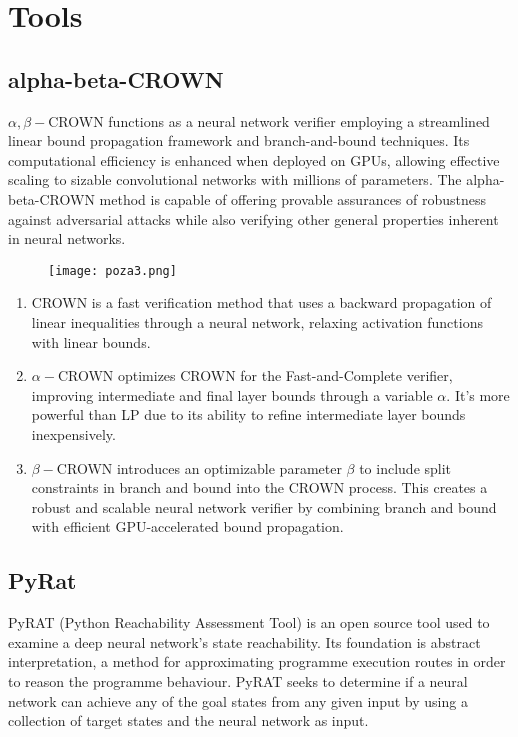 \documentclass[runningheads]{llncs}
\begin{document}
\section{Tools}

\subsection{alpha-beta-CROWN}
\vspace{5mm}
$\alpha,\beta -$CROWN functions as a neural network verifier employing a streamlined linear bound propagation framework and branch-and-bound techniques. Its computational efficiency is enhanced when deployed on GPUs, allowing effective scaling to sizable convolutional networks with millions of parameters. The alpha-beta-CROWN method is capable of offering provable assurances of robustness against adversarial attacks while also verifying other general properties inherent in neural networks.
\begin{center}
\begin{figure}[h]
\texttt{[image: poza3.png]}
\end{figure}
\end{center}

\begin{enumerate}
    \item CROWN is a fast verification method that uses a backward propagation of linear inequalities through a neural network, relaxing activation functions with linear bounds.
    \item $\alpha-$CROWN optimizes CROWN for the Fast-and-Complete verifier, improving intermediate and final layer bounds through a variable $\alpha$. It's more powerful than LP due to its ability to refine intermediate layer bounds inexpensively.
    \item $\beta-$CROWN introduces an optimizable parameter $\beta$ to include split constraints in branch and bound into the CROWN process. This creates a robust and scalable neural network verifier by combining branch and bound with efficient GPU-accelerated bound propagation.
\end{enumerate}

\subsection{PyRat}
\vspace{5mm}
PyRAT (Python Reachability Assessment Tool) is an open source tool used to examine a deep neural network's state reachability. Its foundation is abstract interpretation, a method for approximating programme execution routes in order to reason the programme behaviour. PyRAT seeks to determine if a neural network can achieve any of the goal states from any given input by using a collection of target states and the neural network as input.
\end{document}
